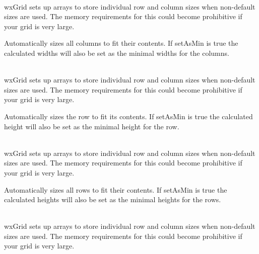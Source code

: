 \\
wxGrid sets up arrays to store individual row and column sizes when non-default sizes are used.
The memory requirements for this could become prohibitive if your grid is very large.



\label{wxgridautosizecolumns}


Automatically sizes all columns to fit their contents. If setAsMin is true the calculated widths will
also be set as the minimal widths for the columns.

\\
wxGrid sets up arrays to store individual row and column sizes when non-default sizes are used.
The memory requirements for this could become prohibitive if your grid is very large.



\label{wxgridautosizerow}


Automatically sizes the row to fit its contents. If setAsMin is true the calculated height will
also be set as the minimal height for the row.

\\
wxGrid sets up arrays to store individual row and column sizes when non-default sizes are used.
The memory requirements for this could become prohibitive if your grid is very large.



\label{wxgridautosizerows}


Automatically sizes all rows to fit their contents. If setAsMin is true the calculated heights will
also be set as the minimal heights for the rows.

\\
wxGrid sets up arrays to store individual row and column sizes when non-default sizes are used.
The memory requirements for this could become prohibitive if your grid is very large.



\label{wxgridbeginbatch}


